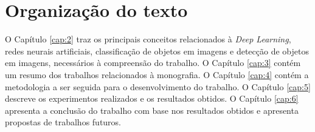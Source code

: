 \section{Organização do texto}
\label{secao:1:4}

O Capítulo \ref{cap:2} traz os principais conceitos relacionados à \textit{Deep Learning}, redes neurais artificiais, classificação de objetos em imagens e detecção de objetos em imagens, necessários à compreensão do trabalho. O Capítulo \ref{cap:3} contém um resumo dos trabalhos relacionados à monografia. O Capítulo \ref{cap:4} contém a metodologia a ser seguida para o desenvolvimento do trabalho. O Capítulo \ref{cap:5} descreve os experimentos realizados e os resultados obtidos. O Capítulo \ref{cap:6} apresenta a conclusão do trabalho com base nos resultados obtidos e apresenta propostas de trabalhos futuros.